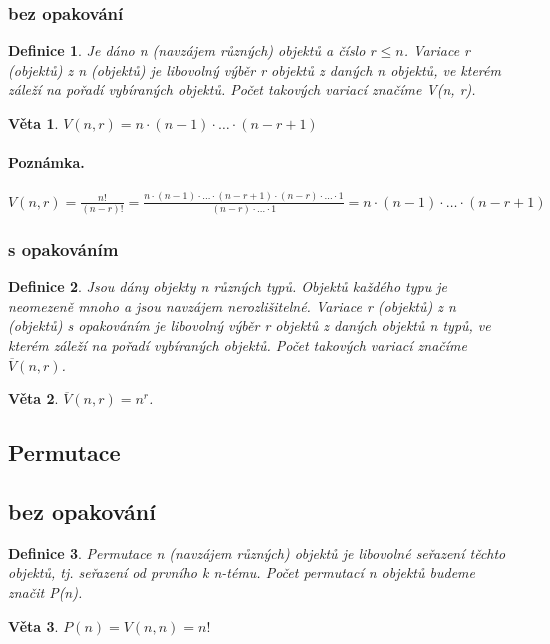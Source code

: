 \documentclass[12pt,a4paper]{article}
\newtheorem{definition}{Definice}
\newtheorem{sentence}{Věta}
\begin{document}
\subsubsection{bez opakování}
\begin{definition}
	Je dáno n (navzájem různých) objektů a číslo $r \leq n$. Variace r
(objektů) z n (objektů) je libovolný výběr r objektů z daných n objektů, ve kterém záleží na
pořadí vybíraných objektů. Počet takových variací značíme V(n, r).
\end{definition}
\begin{sentence}
	$V(n, r) = n \cdot (n - 1) \cdot \dots \cdot (n - r + 1)$
\end{sentence}
\paragraph{Poznámka.} $V(n, r) = \frac{n!}{(n - r)!} = \frac{n \cdot (n - 1) \cdot \dots \cdot (n - r + 1) \cdot (n - r) \cdot \dots \cdot 1}{(n - r) \cdot \dots \cdot 1} = n \cdot (n - 1) \cdot \dots \cdot (n - r + 1)$

\subsubsection{s opakováním}
\begin{definition}
	Jsou dány objekty n různých typů. Objektů každého typu je neomezeně mnoho a jsou navzájem nerozlišitelné. Variace r (objektů) z n (objektů) s opakováním je libovolný výběr r objektů z daných objektů n typů, ve kterém záleží na pořadí vybíraných objektů. Počet takových variací značíme $\overline{V}(n, r)$.	
\end{definition}
\begin{sentence}
	$\overline{V}(n, r) = n^r$.
\end{sentence}

\subsection{Permutace}
\subsection{bez opakování}
\begin{definition}
	Permutace n (navzájem různých) objektů je libovolné seřazení těchto objektů, tj. seřazení od prvního k n-tému. Počet permutací n objektů budeme značit P(n).
\end{definition}
\begin{sentence}
	$P(n) = V(n, n) = n!$
\end{sentence}
\end{document}
